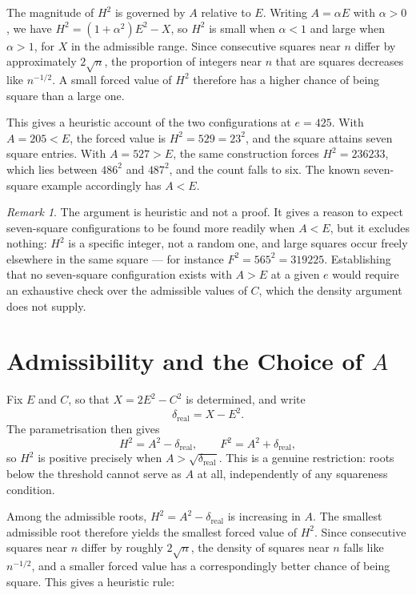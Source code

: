 \documentclass[12pt]{article}
\theoremstyle{remark}
\newtheorem{remark}[theorem]{Remark}
\begin{document}
The magnitude of $H^2$ is governed by $A$ relative to $E$. Writing
$A = \alpha E$ with $\alpha > 0$, we have
$H^2 = (1 + \alpha^2)E^2 - X$, so $H^2$ is small when $\alpha < 1$ and
large when $\alpha > 1$, for $X$ in the admissible range. Since
consecutive squares near $n$ differ by approximately $2\sqrt n$, the
proportion of integers near $n$ that are squares decreases like
$n^{-1/2}$. A small forced value of $H^2$ therefore has a higher
chance of being square than a large one.

This gives a heuristic account of the two configurations at
$e = 425$. With $A = 205 < E$, the forced value is $H^2 = 529 = 23^2$,
and the square attains seven square entries. With $A = 527 > E$, the
same construction forces $H^2 = 236233$, which lies between $486^2$
and $487^2$, and the count falls to six. The known seven-square
example accordingly has $A < E$.

\begin{remark}
The argument is heuristic and not a proof. It gives a reason to expect
seven-square configurations to be found more readily when $A < E$, but
it excludes nothing: $H^2$ is a specific integer, not a random one, and
large squares occur freely elsewhere in the same square --- for
instance $F^2 = 565^2 = 319225$. Establishing that no seven-square
configuration exists with $A > E$ at a given $e$ would require an
exhaustive check over the admissible values of $C$, which the density
argument does not supply.
\end{remark}

\section{Admissibility and the Choice of $A$}

Fix $E$ and $C$, so that $X = 2E^2 - C^2$ is determined, and write
\[
\delta_{\text{real}} = X - E^2 .
\]
The parametrisation then gives
\[
H^2 = A^2 - \delta_{\text{real}}, \qquad F^2 = A^2 + \delta_{\text{real}} ,
\]
so $H^2$ is positive precisely when $A > \sqrt{\delta_{\text{real}}}$. This is a
genuine restriction: roots below the threshold cannot serve as $A$ at
all, independently of any squareness condition.

Among the admissible roots, $H^2 = A^2 - \delta_{\text{real}}$ is increasing in $A$.
The smallest admissible root therefore yields the smallest forced value
of $H^2$. Since consecutive squares near $n$ differ by roughly
$2\sqrt n$, the density of squares near $n$ falls like $n^{-1/2}$, and a
smaller forced value has a correspondingly better chance of being
square. This gives a heuristic rule:
\end{document}
